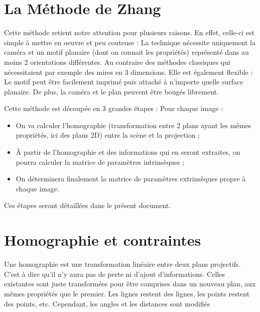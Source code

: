 \documentclass{article}
\begin{document}

\section{La Méthode de Zhang}

Cette méthode retient notre attention pour plusieurs raisons. En effet, celle-ci est simple à mettre en oeuvre et peu couteuse :
La technique nécessite uniquement la caméra et un motif planaire (dont on connait les propriétés) représenté dans au moins 2 orientations différentes. Au contraire des méthodes classiques qui nécessitaient par exemple des mires en 3 dimensions.
Elle est également flexible :
Le motif peut être facilement imprimé puis attaché à n'importe quelle surface planaire. De plus, la caméra et le plan peuvent être bougés librement.

Cette méthode est découpée en 3 grandes étapes :
Pour chaque image :
\begin{itemize}
  \item On va calculer l'homographie (transformation entre 2 plans ayant les mêmes propriétés, ici des plans 2D) entre la scène et la projection ;
  \item À partir de l'homographie et des informations qui en seront extraites, on pourra calculer la matrice de paramètres intrinsèques ;
  \item On déterminera finalement la matrice de paramètres extrinsèques propre à chaque image.
\end{itemize}

Ces étapes seront détaillées dans le présent document.

\clearpage


\section{Homographie et contraintes}

Une homographie est une transformation linéaire entre deux plans projectifs. C'est à dire qu'il n'y aura pas de perte ni d'ajout d'informations. Celles existantes sont juste transformées pour être comprises dans un nouveau plan, aux mêmes propriétés que le premier. Les lignes restent des lignes, les points restent des points, etc. Cependant, les angles et les distances sont modifiés
\end{document}
